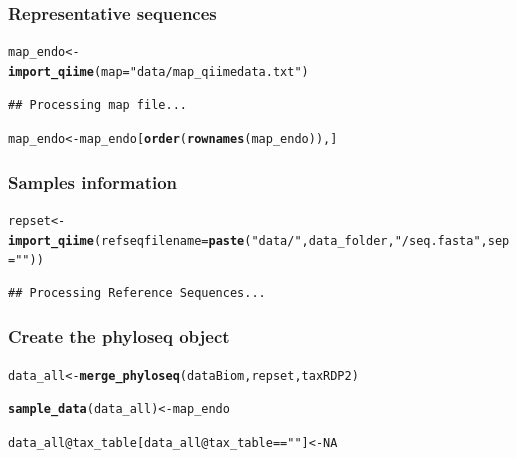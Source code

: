 \documentclass[12pt]{article}\usepackage[]{graphicx}\usepackage[]{color}
\makeatletter
\newcommand{\hlnum}[1]{\textcolor[rgb]{0.686,0.059,0.569}{#1}}%
\newcommand{\hlstr}[1]{\textcolor[rgb]{0.192,0.494,0.8}{#1}}%
\newcommand{\hlopt}[1]{\textcolor[rgb]{0,0,0}{#1}}%
\newcommand{\hlstd}[1]{\textcolor[rgb]{0.345,0.345,0.345}{#1}}%
\newcommand{\hlkwb}[1]{\textcolor[rgb]{0.69,0.353,0.396}{#1}}%
\newcommand{\hlkwc}[1]{\textcolor[rgb]{0.333,0.667,0.333}{#1}}%
\newcommand{\hlkwd}[1]{\textcolor[rgb]{0.737,0.353,0.396}{\textbf{#1}}}%
\newenvironment{kframe}{%
 \def\at@end@of@kframe{}%
 \ifinner\ifhmode%
  \def\at@end@of@kframe{\end{minipage}}%
  \begin{minipage}{\columnwidth}%
 \fi\fi%
 \def\FrameCommand##1{\hskip\@totalleftmargin \hskip-\fboxsep
 \colorbox{shadecolor}{##1}\hskip-\fboxsep
     \hskip-\linewidth \hskip-\@totalleftmargin \hskip\columnwidth}%
 \MakeFramed {\advance\hsize-\width
   \@totalleftmargin\z@ \linewidth\hsize
   \@setminipage}}%
 {\par\unskip\endMakeFramed%
 \at@end@of@kframe}
\newenvironment{knitrout}{}{} %
\numberwithin{figure}{section}
\makeatother
\begin{document}
 \subsubsection{Representative sequences}
\begin{knitrout}\small
{}\color{fgcolor}\begin{kframe}
\begin{alltt}
\hlstd{map_endo} \hlkwb{<-}
  \hlkwd{import_qiime}\hlstd{(}\hlkwc{map} \hlstd{=} \hlstr{"data/map_qiimedata.txt"}\hlstd{)}
\end{alltt}
\begin{verbatim}
## Processing map file...
\end{verbatim}
\begin{alltt}
\hlstd{map_endo} \hlkwb{<-} \hlstd{map_endo[}\hlkwd{order}\hlstd{(}\hlkwd{rownames}\hlstd{(map_endo)),]}
\end{alltt}
\end{kframe}
\end{knitrout}

 \subsubsection{Samples information}
\begin{knitrout}\small
{}\color{fgcolor}\begin{kframe}
\begin{alltt}
\hlstd{repset} \hlkwb{<-} \hlkwd{import_qiime}\hlstd{(}\hlkwc{refseqfilename} \hlstd{=} \hlkwd{paste}\hlstd{(}\hlstr{"data/"}\hlstd{, data_folder,} \hlstr{"/seq.fasta"}\hlstd{,} \hlkwc{sep}\hlstd{=}\hlstr{""}\hlstd{))}
\end{alltt}
\begin{verbatim}
## Processing Reference Sequences...
\end{verbatim}
\end{kframe}
\end{knitrout}

 \subsubsection{Create the phyloseq object}

\begin{knitrout}\small
{}\color{fgcolor}\begin{kframe}
\begin{alltt}
\hlstd{data_all} \hlkwb{<-} \hlkwd{merge_phyloseq}\hlstd{(dataBiom, repset, taxRDP2)}

\hlkwd{sample_data}\hlstd{(data_all)} \hlkwb{<-} \hlstd{map_endo}

\hlstd{data_all}\hlopt{@}\hlkwc{tax_table}\hlstd{[data_all}\hlopt{@}\hlkwc{tax_table} \hlopt{==} \hlstr{""}\hlstd{]} \hlkwb{<-} \hlnum{NA}
\end{alltt}
\end{kframe}
\end{knitrout}
\end{document}
